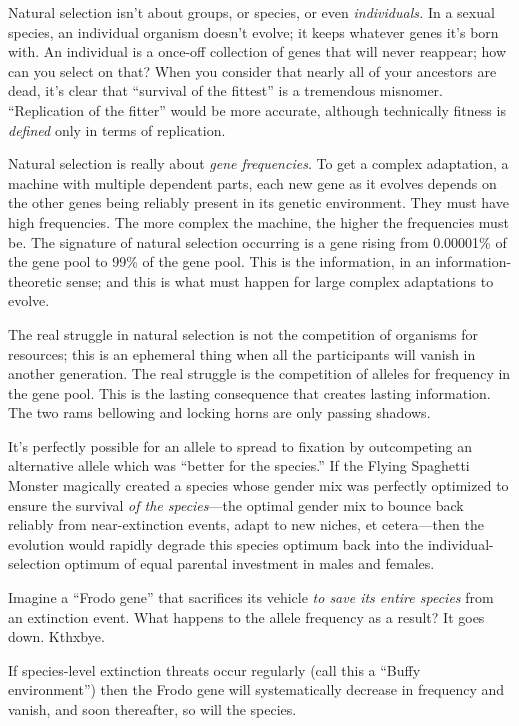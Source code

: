 {{
 Natural selection isn't about groups, or species,
or even \textit{individuals.} In a sexual species, an individual
organism doesn't evolve; it keeps whatever genes
it's born with. An individual is a once-off collection
of genes that will never reappear; how can you select on that? When you
consider that nearly all of your ancestors are dead,
it's clear that ``survival of the
fittest'' is a tremendous misnomer.
``Replication of the fitter'' would
be more accurate, although technically fitness is \textit{defined} only
in terms of replication.}

{
 Natural selection is really about \textit{gene frequencies}. To
get a complex adaptation, a machine with multiple dependent parts, each
new gene as it evolves depends on the other genes being reliably
present in its genetic environment. They must have high frequencies.
The more complex the machine, the higher the frequencies must be. The
signature of natural selection occurring is a gene rising from
0.00001\% of the gene pool to 99\% of the gene pool. This is the
information, in an information-theoretic sense; and this is what must
happen for large complex adaptations to evolve.}

{
 The real struggle in natural selection is not the competition of
organisms for resources; this is an ephemeral thing when all the
participants will vanish in another generation. The real struggle is
the competition of alleles for frequency in the gene pool. This is the
lasting consequence that creates lasting information. The two rams
bellowing and locking horns are only passing shadows.}

{
 It's perfectly possible for an allele to spread to
fixation by outcompeting an alternative allele which was
``better for the species.'' If the
Flying Spaghetti Monster magically created a species whose gender mix
was perfectly optimized to ensure the survival \textit{of the
species}{}---the optimal gender mix to bounce back reliably from
near-extinction events, adapt to new niches, et cetera---then the
evolution would rapidly degrade this species optimum back into the
individual-selection optimum of equal parental investment in males and
females.}

{
 Imagine a ``Frodo gene'' that
sacrifices its vehicle \textit{to save its entire species} from an
extinction event. What happens to the allele frequency as a result? It
goes down. Kthxbye.}

{
 If species-level extinction threats occur regularly (call this a
``Buffy environment'') then the
Frodo gene will systematically decrease in frequency and vanish, and
soon thereafter, so will the species.}

}
